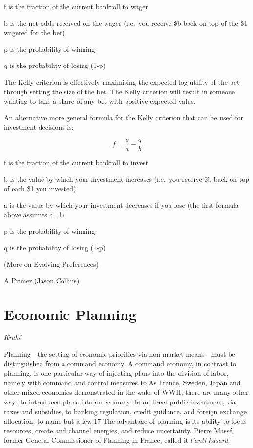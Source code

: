 \documentclass[
]{book}
\begin{document}
f is the fraction of the current bankroll to wager

b is the net odds received on the wager (i.e.~you receive \$b back on top of the \$1 wagered for the bet)

p is the probability of winning

q is the probability of losing (1-p)

The Kelly criterion is effectively maximising the expected log utility of the bet
through setting the size of the bet.
The Kelly criterion will result in someone wanting to take
a share of any bet with positive expected value.

An alternative more general formula for the Kelly criterion that can be used for investment decisions is:

\[f = \frac{p}{a} - \frac{q}{b}\]

f is the fraction of the current bankroll to invest

b is the value by which your investment increases (i.e.~you receive \$b back on top of each \$1 you invested)

a is the value by which your investment decreases if you lose (the first formula above assumes a=1)

p is the probability of winning

q is the probability of losing (1-p)

(More on Evolving Preferences)

\href{https://jasoncollins.blog/2020/01/22/ergodicity-economics-a-primer/}{A Primer (Jason Collins)}

\hypertarget{economic-planning}{%
\chapter{Economic Planning}\label{economic-planning}}

\emph{Krahé}

Planning---the setting of economic priorities via non-market means---must be distinguished from a command economy. A command economy, in contrast to planning, is one particular way of injecting plans into the division of labor, namely with command and control measures.16 As France, Sweden, Japan and other mixed economies demonstrated in the wake of WWII, there are many other ways to introduced plans into an economy: from direct public investment, via taxes and subsidies, to banking regulation, credit guidance, and foreign exchange allocation, to name but a few.17 The advantage of planning is its ability to focus resources, create and channel energies, and reduce uncertainty. Pierre Massé, former General Commissioner of Planning in France, called it \emph{l'anti-hasard}.
\end{document}

